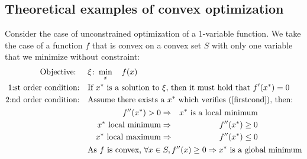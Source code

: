 \documentclass[../convex_optimization.tex]{subfiles}
\begin{document}
\subsection{Theoretical examples of convex optimization}
Consider the case of unconstrained optimization of a 1-variable function.
We take the case of a function $f$ that is convex on a convex set $S$
with only one variable that we minimize without constraint:
\begin{align}
    \text{Objective: } &\quad\xi\colon \min_{x} \quad f(x)
    \nonumber\\
    \text{1:st order condition:} &\quad
    \text{If $x^*$ is a solution to $\xi$,
    then it must hold that $f'(x^*) = 0$}\label{firstcond}\\
    \text{2:nd order condition:} &\quad
    \text{Assume there exists a $x^*$ which verifies (\ref{firstcond}), then:}
    \nonumber\\& \qquad
    \begin{aligned}
        f''(x^*) > 0 &\Rightarrow & x^* \text{ is a local minimum}\\
        x^* \text{ local minimum} & \Rightarrow & f''(x^*) \geq 0\\
        x^* \text{ local maximum} & \Rightarrow & f''(x^*) \leq 0
    \end{aligned}\\
    &\quad
    \text{As $f$ is convex, } \forall x \in S, f''(x) \geq 0
    \Rightarrow x^* \text{ is a global minimum}\nonumber
\end{align}
\end{document}
